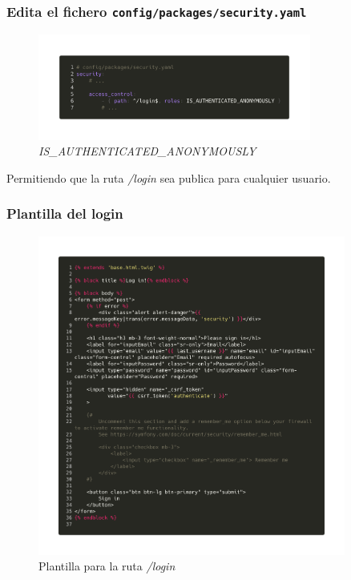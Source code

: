 \subsubsection{Edita el fichero \textbf{\texttt{config/packages/security.yaml}}}

\begin{figure}[ht]
  \centering
  \includegraphics[width=0.8\textwidth]{../assets/access_control.png}
  \caption{\textit{IS\_AUTHENTICATED\_ANONYMOUSLY}}
  \label{fig:access_control}
\end{figure}
Permitiendo que la ruta \textit{/login} sea publica para cualquier usuario.

\clearpage
\subsubsection{Plantilla del login}

\begin{figure}[ht]
  \centering
  \includegraphics[width=0.9\textwidth]{../assets/login_template.png}
  \caption{Plantilla para la ruta \textit{/login}}
  \label{fig:login_template}
\end{figure}
\clearpage

